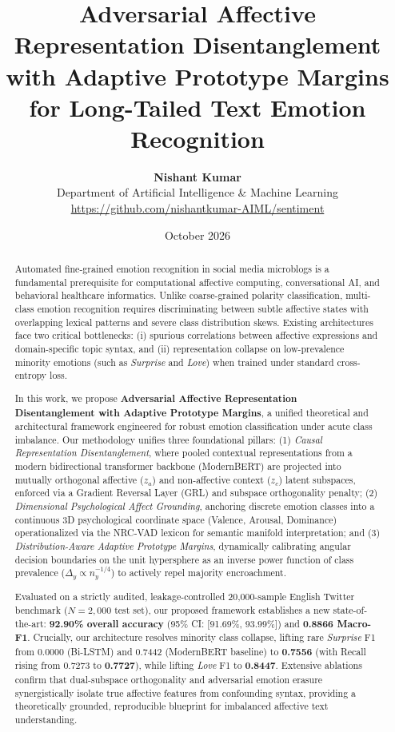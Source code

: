 \documentclass[journal,twocolumn]{article}
\title{\textbf{\LARGE Adversarial Affective Representation Disentanglement with Adaptive Prototype Margins for Long-Tailed Text Emotion Recognition}}
\author{
    \textbf{Nishant Kumar}\\
    Department of Artificial Intelligence \& Machine Learning\\
    \url{https://github.com/nishantkumar-AIML/sentiment}
}
\date{October 2026}
\begin{document}
\maketitle

\begin{abstract}
Automated fine-grained emotion recognition in social media microblogs is a fundamental prerequisite for computational affective computing, conversational AI, and behavioral healthcare informatics. Unlike coarse-grained polarity classification, multi-class emotion recognition requires discriminating between subtle affective states with overlapping lexical patterns and severe class distribution skews. Existing architectures face two critical bottlenecks: (i) spurious correlations between affective expressions and domain-specific topic syntax, and (ii) representation collapse on low-prevalence minority emotions (such as \textit{Surprise} and \textit{Love}) when trained under standard cross-entropy loss.

In this work, we propose \textbf{Adversarial Affective Representation Disentanglement with Adaptive Prototype Margins}, a unified theoretical and architectural framework engineered for robust emotion classification under acute class imbalance. Our methodology unifies three foundational pillars: (1) \textit{Causal Representation Disentanglement}, where pooled contextual representations from a modern bidirectional transformer backbone (ModernBERT) are projected into mutually orthogonal affective ($z_a$) and non-affective context ($z_c$) latent subspaces, enforced via a Gradient Reversal Layer (GRL) and subspace orthogonality penalty; (2) \textit{Dimensional Psychological Affect Grounding}, anchoring discrete emotion classes into a continuous 3D psychological coordinate space (Valence, Arousal, Dominance) operationalized via the NRC-VAD lexicon for semantic manifold interpretation; and (3) \textit{Distribution-Aware Adaptive Prototype Margins}, dynamically calibrating angular decision boundaries on the unit hypersphere as an inverse power function of class prevalence ($\Delta_y \propto n_y^{-1/4}$) to actively repel majority encroachment.

Evaluated on a strictly audited, leakage-controlled 20,000-sample English Twitter benchmark ($N=2,000$ test set), our proposed framework establishes a new state-of-the-art: \textbf{92.90\% overall accuracy} (95\% CI: [91.69\%, 93.99\%]) and \textbf{0.8866 Macro-F1}. Crucially, our architecture resolves minority class collapse, lifting rare \textit{Surprise} F1 from 0.0000 (Bi-LSTM) and 0.7442 (ModernBERT baseline) to \textbf{0.7556} (with Recall rising from 0.7273 to \textbf{0.7727}), while lifting \textit{Love} F1 to \textbf{0.8447}. Extensive ablations confirm that dual-subspace orthogonality and adversarial emotion erasure synergistically isolate true affective features from confounding syntax, providing a theoretically grounded, reproducible blueprint for imbalanced affective text understanding.
\end{abstract}
\end{document}
